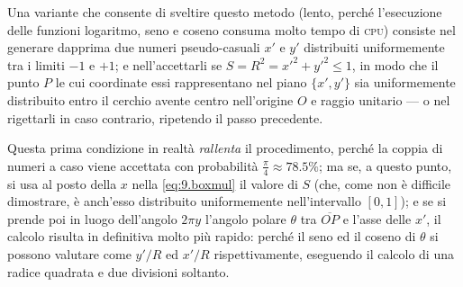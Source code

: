 Una variante che consente di sveltire questo metodo (lento,
perch\'e l'esecuzione delle funzioni logaritmo, seno e
coseno consuma molto tempo di \textsc{cpu}) consiste nel
generare dapprima due numeri pseudo-casuali $x'$ e $y'$
distribuiti uniformemente tra i limiti $-1$ e $+1$; e
nell'accettarli se $S = R^2 = {x'}^2 + {y'}^2 \leq 1$, in
modo che il punto $P$ le cui coordinate essi rappresentano
nel piano $\{ x', y' \}$ sia uniformemente distribuito entro
il cerchio avente centro nell'origine $O$ e raggio unitario
--- o nel rigettarli in caso contrario, ripetendo il passo
precedente.

Questa prima condizione in realt\`a \emph{rallenta} il
procedimento, perch\'e la coppia di numeri a caso viene
accettata con probabilit\`a $\frac{\pi}{4} \approx 78.5\%$;
ma se, a questo punto, si usa al posto della $x$ nella
\eqref{eq:9.boxmul} il valore di $S$ (che, come non \`e
difficile dimostrare, \`e anch'esso distribuito
uniformemente nell'intervallo $[0,1]$); e se si prende poi
in luogo dell'angolo $2 \pi y$ l'angolo polare $\theta$ tra
$\overline{OP}$ e l'asse delle $x'$, il calcolo risulta in
definitiva molto pi\`u rapido: perch\'e il seno ed il coseno
di $\theta$ si possono valutare come $y'/R$ ed $x'/R$
rispettivamente, eseguendo il calcolo di una radice quadrata
e due divisioni soltanto.%
%

\endinput
